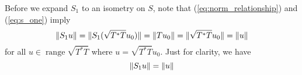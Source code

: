 \documentclass{article}
\begin{document}
Before we expand $S_1$ to an isometry on $S$, note that (\ref{eq:norm_relationship}) and (\ref{eq:s_one}) imply
\[\lVert S_1 u\rVert=\lVert S_1(\sqrt{T^*T}u_0)\rVert=\lVert Tu_0\rVert=\lVert\sqrt{T^*T}u_0\rVert=\lVert u\rVert\]
for all $u\in\operatorname{range}\sqrt{T^*T}$ where $u=\sqrt{T^*T}u_0$. Just for clarity, we have
\begin{equation}\label{eq:norm_relation_s_one}
    \lVert S_1 u\rVert=\lVert u\rVert
\end{equation}
\end{document}
